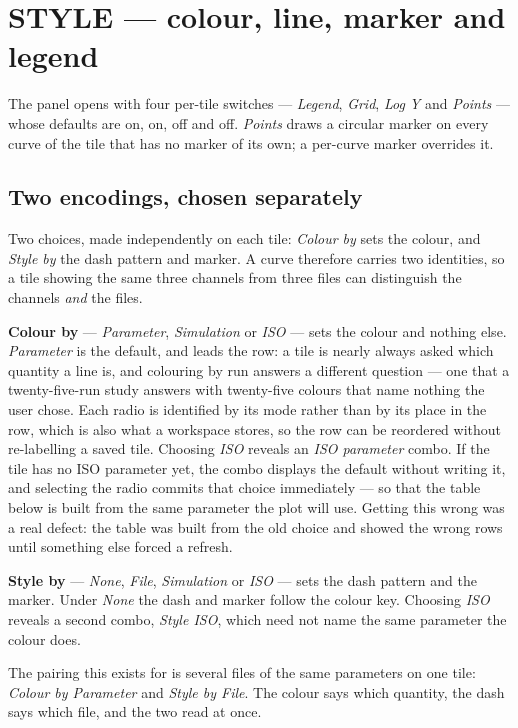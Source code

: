 \documentclass[11pt,a4paper,oneside]{report}
\begin{document}
\section{STYLE --- colour, line, marker and legend}
\label{sec:style}

The panel opens with four per-tile switches --- \emph{Legend}, \emph{Grid},
\emph{Log Y} and \emph{Points} --- whose defaults are on, on, off and off.
\emph{Points} draws a circular marker on every curve of the tile that has no
marker of its own; a per-curve marker overrides it.

\subsection{Two encodings, chosen separately}

Two choices, made independently on each tile: \emph{Colour by} sets the colour,
and \emph{Style by} the dash pattern and marker. A curve therefore carries two
identities, so a tile showing the same three channels from three files can
distinguish the channels \emph{and} the files.

\textbf{Colour by} --- \emph{Parameter}, \emph{Simulation} or \emph{ISO} --- sets
the colour and nothing else. \emph{Parameter} is the default, and leads the
row: a tile is nearly always asked which quantity a line is, and colouring by
run answers a different question --- one that a twenty-five-run study answers
with twenty-five colours that name nothing the user chose. Each radio is
identified by its mode rather than by its place in the row, which is also what
a workspace stores, so the row can be reordered without re-labelling a saved
tile. Choosing \emph{ISO} reveals an \emph{ISO parameter}
combo. If the tile has no ISO parameter yet, the combo displays the default
without writing it, and selecting the radio commits that choice immediately ---
so that the table below is built from the same parameter the plot will use.
Getting this wrong was a real defect: the table was built from the old choice and
showed the wrong rows until something else forced a refresh.

\textbf{Style by} --- \emph{None}, \emph{File}, \emph{Simulation} or \emph{ISO}
--- sets the dash pattern and the marker. Under \emph{None} the dash and marker
follow the colour key. Choosing \emph{ISO} reveals a second
combo, \emph{Style ISO}, which need not name the same parameter the colour does.

The pairing this exists for is several files of the same parameters on one tile:
\emph{Colour by Parameter} and \emph{Style by File}. The colour says which
quantity, the dash says which file, and the two read at once.
\end{document}
